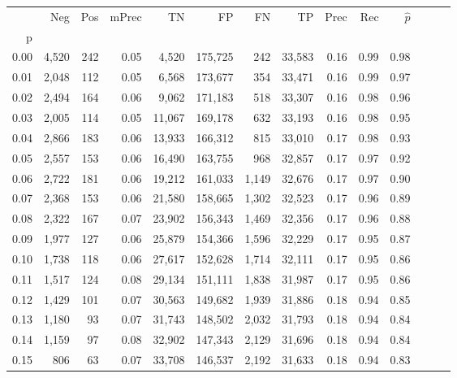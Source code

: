 \begin{tabular}{rrrrrrrrrrrrrr}
\toprule
{} &    Neg &  Pos & mPrec &       TN &       FP &      FN &      TP &  Prec &   Rec & $\hat{p}$ \\
p    &        &      &       &          &          &         &         &       &       &           \\
\midrule
0.00 &  4,520 &  242 &  0.05 &    4,520 &  175,725 &     242 &  33,583 &  0.16 &  0.99 &      0.98 \\
0.01 &  2,048 &  112 &  0.05 &    6,568 &  173,677 &     354 &  33,471 &  0.16 &  0.99 &      0.97 \\
0.02 &  2,494 &  164 &  0.06 &    9,062 &  171,183 &     518 &  33,307 &  0.16 &  0.98 &      0.96 \\
0.03 &  2,005 &  114 &  0.05 &   11,067 &  169,178 &     632 &  33,193 &  0.16 &  0.98 &      0.95 \\
0.04 &  2,866 &  183 &  0.06 &   13,933 &  166,312 &     815 &  33,010 &  0.17 &  0.98 &      0.93 \\
0.05 &  2,557 &  153 &  0.06 &   16,490 &  163,755 &     968 &  32,857 &  0.17 &  0.97 &      0.92 \\
0.06 &  2,722 &  181 &  0.06 &   19,212 &  161,033 &   1,149 &  32,676 &  0.17 &  0.97 &      0.90 \\
0.07 &  2,368 &  153 &  0.06 &   21,580 &  158,665 &   1,302 &  32,523 &  0.17 &  0.96 &      0.89 \\
0.08 &  2,322 &  167 &  0.07 &   23,902 &  156,343 &   1,469 &  32,356 &  0.17 &  0.96 &      0.88 \\
0.09 &  1,977 &  127 &  0.06 &   25,879 &  154,366 &   1,596 &  32,229 &  0.17 &  0.95 &      0.87 \\
0.10 &  1,738 &  118 &  0.06 &   27,617 &  152,628 &   1,714 &  32,111 &  0.17 &  0.95 &      0.86 \\
0.11 &  1,517 &  124 &  0.08 &   29,134 &  151,111 &   1,838 &  31,987 &  0.17 &  0.95 &      0.86 \\
0.12 &  1,429 &  101 &  0.07 &   30,563 &  149,682 &   1,939 &  31,886 &  0.18 &  0.94 &      0.85 \\
0.13 &  1,180 &   93 &  0.07 &   31,743 &  148,502 &   2,032 &  31,793 &  0.18 &  0.94 &      0.84 \\
0.14 &  1,159 &   97 &  0.08 &   32,902 &  147,343 &   2,129 &  31,696 &  0.18 &  0.94 &      0.84 \\
0.15 &    806 &   63 &  0.07 &   33,708 &  146,537 &   2,192 &  31,633 &  0.18 &  0.94 &      0.83 \\

\end{tabular}
